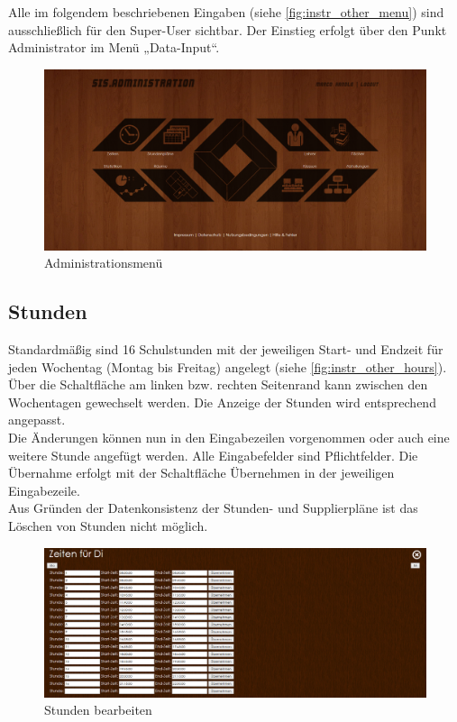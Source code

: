 Alle im folgendem beschriebenen Eingaben (siehe \autoref{fig:instr_other_menu}) sind ausschließlich für den Super-User sichtbar. Der Einstieg erfolgt über den Punkt Administrator im Menü „Data-Input“.
\begin{figure}[H]
\centering
\includegraphics[keepaspectratio=true, width=14cm]{images/screenshots/admin_menu.png}
\caption{Administrationsmenü}
\label{fig:instr_other_menu}
\end{figure}
\subsection{Stunden}\label{sec:instr_other_hours}
Standardmäßig sind 16 Schulstunden mit der jeweiligen Start- und Endzeit für jeden Wochentag (Montag bis Freitag) angelegt (siehe \autoref{fig:instr_other_hours}). Über die Schaltfläche am linken bzw. rechten Seitenrand kann zwischen den Wochentagen gewechselt werden. Die Anzeige der Stunden wird entsprechend angepasst.\\
Die Änderungen können nun in den Eingabezeilen vorgenommen oder auch eine weitere Stunde angefügt werden. Alle Eingabefelder sind Pflichtfelder. Die Übernahme erfolgt mit der Schaltfläche Übernehmen in der jeweiligen Eingabezeile.\\
Aus Gründen der Datenkonsistenz der Stunden- und Supplierpläne ist das Löschen von Stunden nicht möglich.
\begin{figure}[H]
\centering
\includegraphics[keepaspectratio=true, width=14cm]{images/screenshots/hours_input.png}
\caption{Stunden bearbeiten}
\label{fig:instr_other_hours}
\end{figure}
